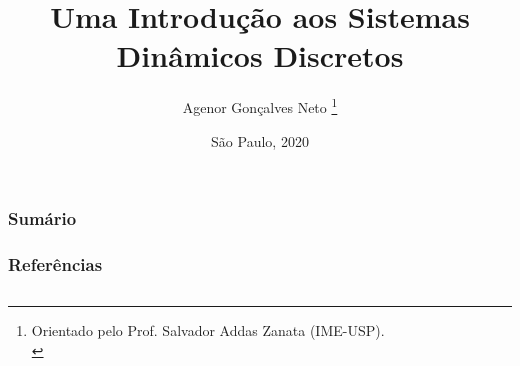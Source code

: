 \documentclass[11pt, portuguese, aspectratio=1610]{beamer}
\title{Uma Introdução aos Sistemas Dinâmicos Discretos}\author{Agenor Gonçalves Neto \footnote{Orientado pelo Prof. Salvador Addas Zanata (IME-USP).\\}}
\date{São Paulo, 2020}
\begin{document}

\begin{frame}
\titlepage
\end{frame}

\begin{frame}
\vspace{5pt}
\frametitle{Sumário}
\tableofcontents
\end{frame}








%


%

\begin{frame}
\vspace{5pt}
\frametitle{Referências}
\begin{columns}
\column{\dimexpr\paperwidth-15pt}

\nocite{burns, devaney, holmgren}



\end{columns}
\end{frame}
\end{document}
